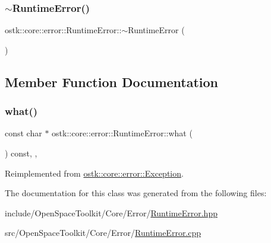 \mbox{\label{classostk_1_1core_1_1error_1_1_runtime_error_a65b0f31efc6a6825703553b8383e1668}} 
\subsubsection{\texorpdfstring{$\sim$\+Runtime\+Error()}{~RuntimeError()}}
{\footnotesize\ttfamily ostk\+::core\+::error\+::\+Runtime\+Error\+::$\sim$\+Runtime\+Error (\begin{DoxyParamCaption}{ }\end{DoxyParamCaption})}



\subsection{Member Function Documentation}
\mbox{\label{classostk_1_1core_1_1error_1_1_runtime_error_a671d71ab5483eaa1ce5cc3400747ded1}} 
\subsubsection{\texorpdfstring{what()}{what()}}
{\footnotesize\ttfamily const char $\ast$ ostk\+::core\+::error\+::\+Runtime\+Error\+::what (\begin{DoxyParamCaption}{ }\end{DoxyParamCaption}) const\hspace{0.3cm}{\ttfamily [override]}, {\ttfamily [virtual]}, {\ttfamily [noexcept]}}



Reimplemented from \hyperlink{classostk_1_1core_1_1error_1_1_exception_ae34ebc20a97277da6e2472b6bb8e3812}{ostk\+::core\+::error\+::\+Exception}.



The documentation for this class was generated from the following files\+:\begin{DoxyCompactItemize}
\item 
include/\+Open\+Space\+Toolkit/\+Core/\+Error/\hyperlink{_runtime_error_8hpp}{Runtime\+Error.\+hpp}\item 
src/\+Open\+Space\+Toolkit/\+Core/\+Error/\hyperlink{_runtime_error_8cpp}{Runtime\+Error.\+cpp}\end{DoxyCompactItemize}
